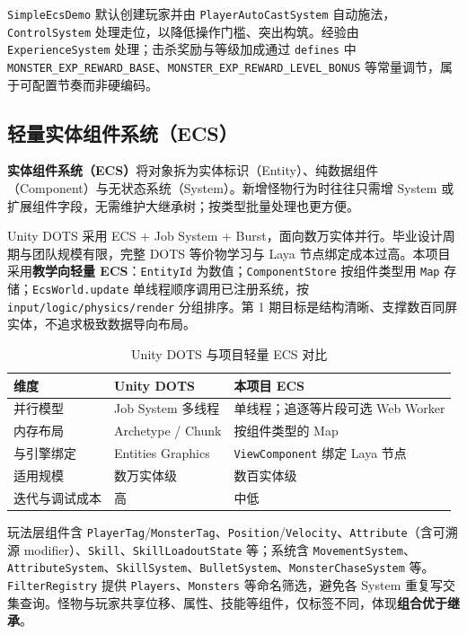 \texttt{SimpleEcsDemo} 默认创建玩家并由 \texttt{PlayerAutoCastSystem} 自动施法，\texttt{ControlSystem} 处理走位，以降低操作门槛、突出构筑。经验由 \texttt{ExperienceSystem} 处理；击杀奖励与等级加成通过 \texttt{defines} 中 \texttt{MONSTER\_EXP\_REWARD\_BASE}、\texttt{MONSTER\_EXP\_REWARD\_LEVEL\_BONUS} 等常量调节，属于可配置节奏而非硬编码。

\subsection{轻量实体组件系统（ECS）}

\textbf{实体组件系统（ECS）}将对象拆为实体标识（Entity）、纯数据组件（Component）与无状态系统（System）。新增怪物行为时往往只需增 System 或扩展组件字段，无需维护大继承树；按类型批量处理也更方便\cite{gregory2018game}。

Unity DOTS 采用 ECS + Job System + Burst，面向数万实体并行\cite{gregory2018game}。毕业设计周期与团队规模有限，完整 DOTS 等价物学习与 Laya 节点绑定成本过高。本项目采用\textbf{教学向轻量 ECS}：\texttt{EntityId} 为数值；\texttt{ComponentStore} 按组件类型用 \texttt{Map} 存储；\texttt{EcsWorld.update} 单线程顺序调用已注册系统，按 \texttt{input/logic/physics/render} 分组排序。第 1 期目标是结构清晰、支撑数百同屏实体，不追求极致数据导向布局。

\begin{table}[htbp]
  \centering
  \caption{Unity DOTS 与项目轻量 ECS 对比}
  \label{tab:dots-compare}
  \begin{tabular}{p{3.2cm}p{4.5cm}p{4.5cm}}
    \toprule
    \textbf{维度} & \textbf{Unity DOTS} & \textbf{本项目 ECS} \\
    \midrule
    并行模型 & Job System 多线程 & 单线程；追逐等片段可选 Web Worker \\
    内存布局 & Archetype / Chunk & 按组件类型的 Map \\
    与引擎绑定 & Entities Graphics & \texttt{ViewComponent} 绑定 Laya 节点 \\
    适用规模 & 数万实体级 & 数百实体级 \\
    迭代与调试成本 & 高 & 中低 \\
    \bottomrule
  \end{tabular}
\end{table}

玩法层组件含 \texttt{PlayerTag}/\texttt{MonsterTag}、\texttt{Position}/\texttt{Velocity}、\texttt{Attribute}（含可溯源 modifier）、\texttt{Skill}、\texttt{SkillLoadoutState} 等；系统含 \texttt{MovementSystem}、\texttt{AttributeSystem}、\texttt{SkillSystem}、\texttt{BulletSystem}、\texttt{MonsterChaseSystem} 等。\texttt{FilterRegistry} 提供 \texttt{Players}、\texttt{Monsters} 等命名筛选，避免各 System 重复写交集查询。怪物与玩家共享位移、属性、技能等组件，仅标签不同，体现\textbf{组合优于继承}。

